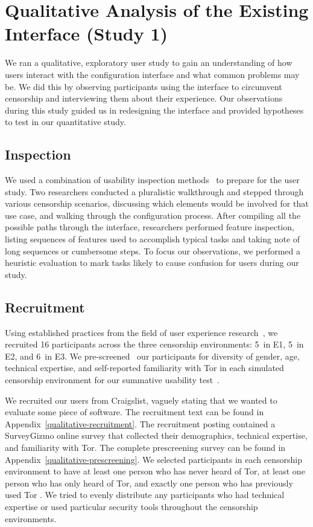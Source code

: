 \documentclass[USenglish,oneside,twocolumn]{article}
\begin{document}
\section{Qualitative Analysis of the Existing Interface (Study 1)}
\label{sec:qualitative}

We ran a qualitative, exploratory user study to gain an 
understanding of how users interact with the configuration interface and
what common problems may be. We did this by observing participants using 
the interface to circumvent censorship and interviewing them about
their experience.  Our observations during this study guided us in
redesigning the interface and provided hypotheses to test in our quantitative study.

\subsection{Inspection}
We used a combination of usability inspection methods~\cite{nielsen1994usability}
to prepare for the user study. Two researchers conducted a pluralistic 
walkthrough and stepped through various censorship
scenarios, discussing which elements would be involved for that use case, and walking 
through the configuration process. After compiling all the possible paths through the 
interface, researchers performed feature inspection, listing sequences of features used 
to accomplish typical tasks and taking note of long sequences or cumbersome
steps. To focus our observations, we performed a heuristic evaluation to mark tasks
likely to cause confusion for users during our study. 

\subsection{Recruitment}
Using established practices from the field of user experience research~\cite{howmanyusers},
we recruited 16 participants across the three censorship environments:
5~in E1, 5~in E2, and 6~in E3.
We pre-screened~\cite{screening} our participants for diversity of gender, age, technical expertise,
and self-reported familiarity with Tor in each simulated censorship environment for our summative
usability test~\cite{summative}. 

We recruited our users from Craigslist, vaguely stating that we wanted to evaluate some piece of software. 
The recruitment text can be found in Appendix~\ref{qualitative-recruitment}. The recruitment posting contained a 
SurveyGizmo online survey that collected their demographics, technical expertise, and familiarity with Tor.
The complete prescreening survey can be found in Appendix~\ref{qualitative-prescreening}.  
We selected participants in each censorship environment to have at least one person who has never heard of Tor, 
at least one person who has only heard of Tor, and exactly one person who has previously used Tor
. We tried to evenly distribute any participants who had technical
expertise or used particular security tools throughout the censorship environments. 
\end{document}
